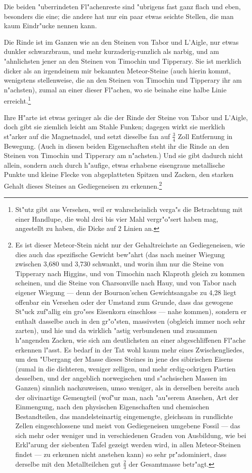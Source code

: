 \documentclass[a4paper, 11pt, oneside, german]{article}
\begin{document}
Die beiden "uberrindeten Fl"achenreste sind "ubrigens fast ganz flach und eben, besonders die eine; die andere hat nur ein paar etwas seichte Stellen, die man kaum Eindr"ucke nennen kann.

Die Rinde ist im Ganzen wie an den Steinen von Tabor und L'Aigle, nur etwas dunkler schwarzbraun, und mehr kurzaderig-runzlich als narbig, und am "ahnlichsten jener an den Steinen von Timochin und Tipperary. Sie ist merklich dicker als an irgendeinem mir bekannten Meteor-Steine (auch hierin kommt, wenigstens stellenweise, die an den Steinen von Timochin und Tipperary ihr am n"achsten), zumal an einer dieser Fl"achen, wo sie beinahe eine halbe Linie erreicht.\footnote{St"utz gibt aus Versehen, weil er wahrscheinlich verga"s die Betrachtung mit einer Handlupe, die wohl drei bis vier Mahl vergr"o"sert haben mag, angestellt zu haben, die Dicke auf 2 Linien an.}

Ihre H"arte ist etwas geringer als die der Rinde der Steine von Tabor und L'Aigle, doch gibt sie ziemlich leicht am Stahle Funken; dagegen wirkt sie merklich st"arker auf die Magnetnadel, und setzt dieselbe fan auf $\frac{3}{4}$ Zoll Entfernung in Bewegung. (Auch in diesen beiden Eigenschaften steht ihr die Rinde an den Steinen von Timochin und Tipperary am n"achsten.) Und sie gibt dadurch nicht allein, sondern auch durch h"aufige, etwas erhabene eisengraue metallische Punkte und kleine Flecke von abgeplatteten Spitzen und Zacken, den starken Gehalt dieses Steines an Gediegeneisen zu erkennen.\footnote{Es ist dieser Meteor-Stein nicht nur der Gehaltreichste an Gediegeneisen, wie dies auch das spezifische Gewicht bew"ahrt (das nach meiner Wiegung zwischen 3,680 und 3,730 schwankt, und worin ihm nur die Steine von Tipperary nach Higgins, und von Timochin nach Klaproth gleich zu kommen scheinen, und die Steine von Charsonville nach Hauy, und von Tabor nach eigener Wiegung --- denn der Bournon'schen Gewichtsangabe zu 4,28 liegt offenbar ein Versehen oder der Umstand zum Grunde, dass das gewogene St"uck zuf"allig ein gro"ses Eisenkorn einschloss --- nahe kommen), sondern er enthalt dasselbe auch in den gr"o"sten, massivsten (obgleich immer noch sehr zarten), und hie und da wirklich "astig verbundenen und zusammen h"angenden Zacken, wie sich am deutlichsten an einer abgeschliffenen Fl"ache erkennen l"asst. Es bedarf in der Tat wohl kaum mehr eines Zwischengliedes, um den "Ubergang der Masse dieses Steines in jene des sibirischen Eisens (zumal in die dichteren, weniger zelligen, und mehr erdig-ockrigen Partien desselben, und der angeblich norwegischen und s"achsischen Massen im Ganzen) sinnlich nachzuweisen, umso weniger, als in derselben bereits auch der olivinartige Gemengteil (wof"ur man, nach "au"serem Ansehen, Art der Einmengung, nach den physischen Eigenschaften und chemischen Bestandteilen, das mandelsteinartig eingemengte, gleichsam in rundlichte Zellen eingeschlossene und meist von Gediegeneisen umgebene Fossil --- das sich mehr oder weniger und in verschiedenen Graden von Ausbildung, wie bei Erkl"arung der siebenten Tafel gezeigt werden wird, in allen Meteor-Steinen findet --- zu erkennen nicht anstehen kann) so sehr pr"adominiert, dass derselbe mit den Metallteilchen gut $\frac{2}{3}$ der Gesamtmasse betr"agt.} 
\end{document}
